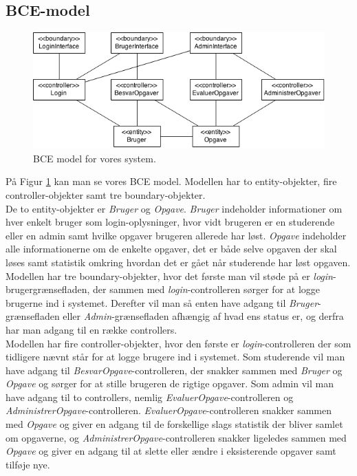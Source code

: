 \documentclass[12pt]{article}
\begin{document}
\subsection{BCE-model}
\begin{figure}[htpb]
  \centering
  \includegraphics[width=0.8\linewidth]{figures/BCE-Model.png}
  \caption{BCE model for vores system.}
  \label{fig:bce_model}
\end{figure}
På Figur \ref{fig:bce_model} kan man se vores BCE model. Modellen har to entity-objekter, fire controller-objekter samt tre boundary-objekter. \\
De to entity-objekter er \emph{Bruger} og \emph{Opgave}. \emph{Bruger} indeholder informationer om hver enkelt bruger som login-oplysninger, hvor vidt brugeren er en studerende eller en admin samt hvilke opgaver brugeren allerede har løst. \emph{Opgave} indeholder alle informationerne om de enkelte opgaver, det er både selve opgaven der skal løses samt statistik omkring hvordan det er gået når studerende har løst opgaven. \\
Modellen har tre boundary-objekter, hvor det første man vil støde på er \emph{login}-brugergrænsefladen, der sammen med \emph{login}-controlleren sørger for at logge brugerne ind i systemet. Derefter vil man så enten have adgang til \emph{Bruger}-grænsefladen eller \emph{Admin}-grænsefladen afhængig af hvad ens status er, og derfra har man adgang til en række controllers. \\
Modellen har fire controller-objekter, hvor den første er \emph{login}-controlleren der som tidligere nævnt står for at logge brugere ind i systemet. Som studerende vil man have adgang til \emph{BesvarOpgave}-controlleren, der snakker sammen med \emph{Bruger} og \emph{Opgave} og sørger for at stille brugeren de rigtige opgaver. Som admin vil man have adgang til to controllers, nemlig \emph{EvaluerOpgave}-controlleren og \emph{AdministrerOpgave}-controlleren. \emph{EvaluerOpgave}-controlleren snakker sammen med \emph{Opgave} og giver en adgang til de forskellige slags statistik der bliver samlet om opgaverne, og \emph{AdministrerOpgave}-controlleren snakker ligeledes sammen med \emph{Opgave} og giver en adgang til at slette eller ændre i eksisterende opgaver samt tilføje nye.
\end{document}
